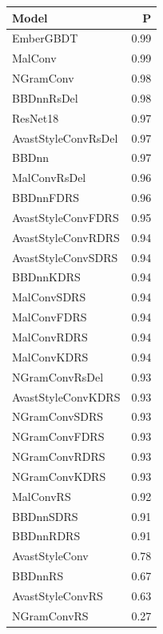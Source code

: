 \begin{tabular}{lr}
\toprule
Model & P \\
\midrule
EmberGBDT & 0.99 \\
MalConv & 0.99 \\
NGramConv & 0.98 \\
BBDnnRsDel & 0.98 \\
ResNet18 & 0.97 \\
AvastStyleConvRsDel & 0.97 \\
BBDnn & 0.97 \\
MalConvRsDel & 0.96 \\
BBDnnFDRS & 0.96 \\
AvastStyleConvFDRS & 0.95 \\
AvastStyleConvRDRS & 0.94 \\
AvastStyleConvSDRS & 0.94 \\
BBDnnKDRS & 0.94 \\
MalConvSDRS & 0.94 \\
MalConvFDRS & 0.94 \\
MalConvRDRS & 0.94 \\
MalConvKDRS & 0.94 \\
NGramConvRsDel & 0.93 \\
AvastStyleConvKDRS & 0.93 \\
NGramConvSDRS & 0.93 \\
NGramConvFDRS & 0.93 \\
NGramConvRDRS & 0.93 \\
NGramConvKDRS & 0.93 \\
MalConvRS & 0.92 \\
BBDnnSDRS & 0.91 \\
BBDnnRDRS & 0.91 \\
AvastStyleConv & 0.78 \\
BBDnnRS & 0.67 \\
AvastStyleConvRS & 0.63 \\
NGramConvRS & 0.27 \\
\bottomrule
\end{tabular}

